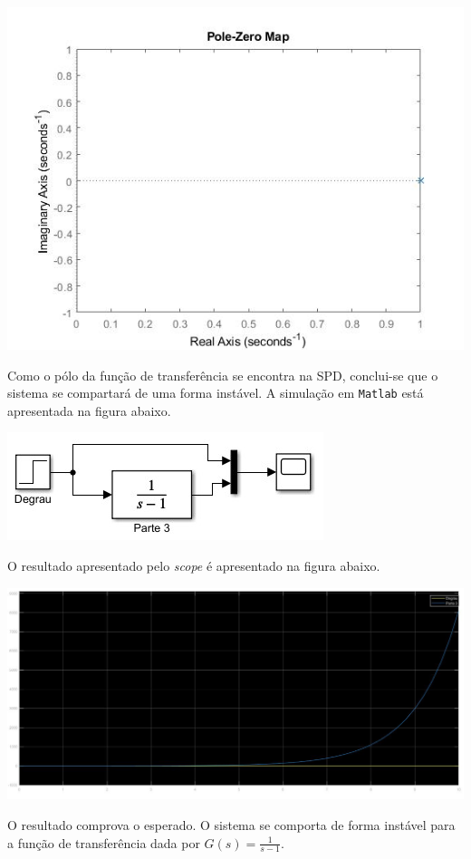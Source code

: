 \documentclass[
]{book}
\begin{document}
\includegraphics{Imagens/Lab2/tau3.jpg}

Como o pólo da função de transferência se encontra na SPD, conclui-se que o sistema se compartará de uma forma instável. A simulação em \texttt{Matlab} está apresentada na figura abaixo.

\includegraphics{Imagens/Lab2/sim2.jpg}

O resultado apresentado pelo \emph{scope} é apresentado na figura abaixo.

\includegraphics{Imagens/Lab2/resultSim2.jpg}

O resultado comprova o esperado. O sistema se comporta de forma instável para a função de transferência dada por \(G(s) = \frac {1}{s-1}\).
\end{document}
